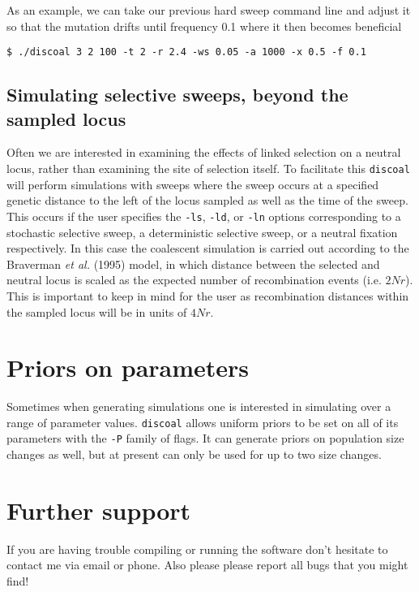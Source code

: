 \documentclass[12pt]{article}
\begin{document}
As an example, we can take our previous hard sweep command line and adjust it so that the mutation drifts until frequency 0.1 where it then becomes beneficial

\begin{verbatim}
$ ./discoal 3 2 100 -t 2 -r 2.4 -ws 0.05 -a 1000 -x 0.5 -f 0.1
\end{verbatim}

\subsection*{Simulating selective sweeps, beyond the sampled locus}
Often we are interested in examining the effects of linked selection on a neutral locus, rather than examining the site of selection itself. To facilitate this \texttt{discoal} will perform simulations with sweeps where the sweep occurs at a specified genetic distance to the left of the locus sampled as well as the time of the sweep. This occurs if the user specifies the \texttt{-ls}, \texttt{-ld}, or \texttt{-ln} options corresponding to a stochastic selective sweep, a deterministic selective sweep, or a neutral fixation respectively. In this case the coalescent simulation is carried out according to the Braverman \emph{et al.} (1995) model, in which distance between the selected and neutral locus is scaled as the expected number of recombination events (i.e. $2Nr$). This is important to keep in mind for the user as recombination distances within the sampled locus will be in units of $4Nr$.

   
\section*{Priors on parameters}
Sometimes when generating simulations one is interested in simulating over a range of parameter values. \texttt{discoal} allows uniform priors to be set on all of its parameters with the \texttt{-P} family of flags. It can generate priors on population size changes as well, but at present can only be used for up to two size changes.


\section*{Further support}
If you are having trouble compiling or running the software don't hesitate to contact me via email or phone. Also please please report all bugs that you might find!



\end{document}
